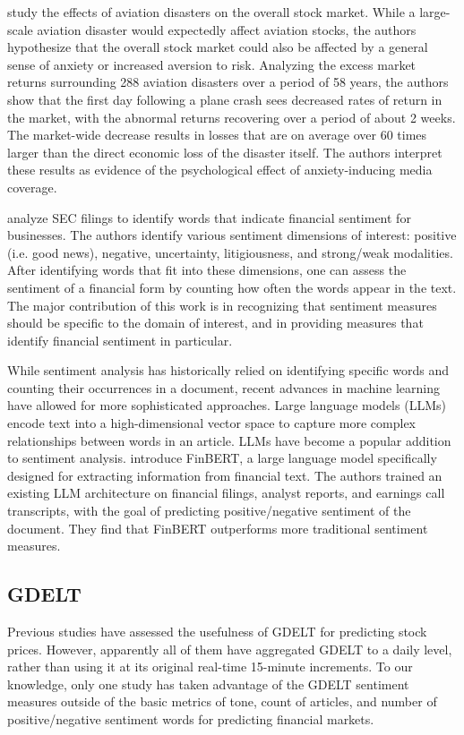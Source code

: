 \documentclass[12pt]{article}
\begin{document}
\textcite{kaplanski2010sentiment} study the effects of aviation disasters on the overall stock market. While a large-scale aviation disaster would expectedly affect aviation stocks, the authors hypothesize that the overall stock market could also be affected by a general sense of anxiety or increased aversion to risk. Analyzing the excess market returns surrounding 288 aviation disasters over a period of 58 years, the authors show that the first day following a plane crash sees decreased rates of return in the market, with the abnormal returns recovering over a period of about 2 weeks. The market-wide decrease results in losses that are on average over 60 times larger than the direct economic loss of the disaster itself. The authors interpret these results as evidence of the psychological effect of anxiety-inducing media coverage.

\textcite{loughran2011liability} analyze SEC filings to identify words that indicate financial sentiment for businesses. The authors identify various sentiment dimensions of interest: positive (i.e. good news), negative, uncertainty, litigiousness, and strong/weak modalities. After identifying words that fit into these dimensions, one can assess the sentiment of a financial form by counting how often the words appear in the text. The major contribution of this work is in recognizing that sentiment measures should be specific to the domain of interest, and in providing measures that identify financial sentiment in particular.

While sentiment analysis has historically relied on identifying specific words and counting their occurrences in a document, recent advances in machine learning have allowed for more sophisticated approaches. Large language models (LLMs) encode text into a high-dimensional vector space to capture more complex relationships between words in an article. LLMs have become a popular addition to sentiment analysis. \textcite{huang2023finbert} introduce FinBERT, a large language model specifically designed for extracting information from financial text. The authors trained an existing LLM architecture on financial filings, analyst reports, and earnings call transcripts, with the goal of predicting positive/negative sentiment of the document. They find that FinBERT outperforms more traditional sentiment measures.

\subsection{GDELT}
Previous studies have assessed the usefulness of GDELT for predicting stock prices. However, apparently all of them have aggregated GDELT to a daily level, rather than using it at its original real-time 15-minute increments. To our knowledge, only one study has taken advantage of the GDELT sentiment measures outside of the basic metrics of tone, count of articles, and number of positive/negative sentiment words for predicting financial markets.
\end{document}
